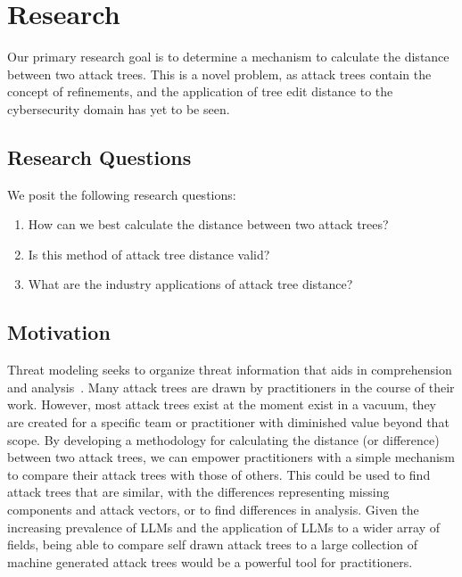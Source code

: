 
\section{Research}

Our primary research goal is to determine a mechanism to calculate the distance between two attack trees. This is a novel problem, as attack trees contain the concept of refinements, and the application of tree edit distance to the cybersecurity domain has yet to be seen.

\subsection{Research Questions}

We posit the following research questions:

\begin{enumerate}
    \item[\RQ{1}] How can we best calculate the distance between two attack trees?
    \item[\RQ{2}] Is this method of attack tree distance valid?
    \item[\RQ{3}] What are the industry applications of attack tree distance?
\end{enumerate}

\subsection{Motivation}


Threat modeling seeks to organize threat information that aids in comprehension and analysis~\cite{andersonSecurityEngineeringGuide2020,schneierSecretsLiesDigital2000}. Many attack trees are drawn by practitioners in the course of their work. However, most attack trees exist at the moment exist in a vacuum, they are created for a specific team or practitioner with diminished value beyond that scope. By developing a methodology for calculating the distance (or difference) between two attack trees, we can empower practitioners with a simple mechanism to compare their attack trees with those of others. This could be used to find attack trees that are similar, with the differences representing missing components and attack vectors, or to find differences in analysis. Given the increasing prevalence of LLMs and the application of LLMs to a wider array of fields, being able to compare self drawn attack trees to a large collection of machine generated attack trees would be a powerful tool for practitioners.




